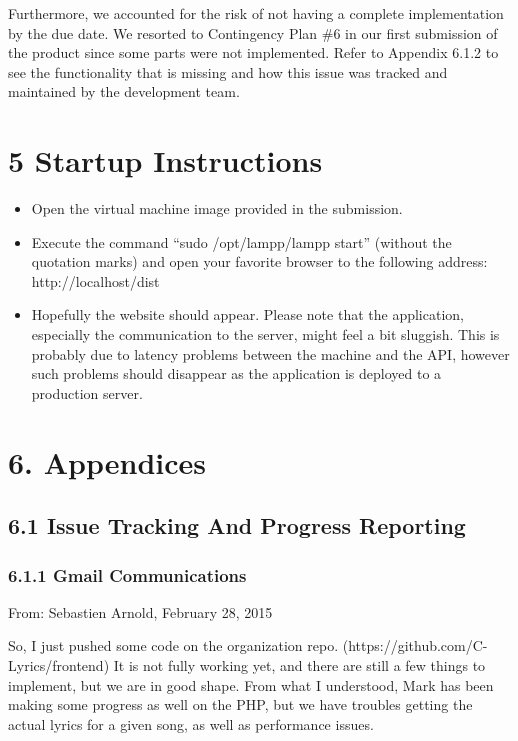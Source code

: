\documentclass[]{article}
\begin{document}
Furthermore, we accounted for the risk of not having a complete
implementation by the due date. We resorted to Contingency Plan \#6 in
our first submission of the product since some parts were not
implemented. Refer to Appendix 6.1.2 to see the functionality that is
missing and how this issue was tracked and maintained by the development
team.

\section{5 Startup Instructions}\label{startup-instructions}

\begin{itemize}
\itemsep1pt\parskip0pt
\item
  Open the virtual machine image provided in the submission.
\item
  Execute the command ``sudo /opt/lampp/lampp start'' (without the
  quotation marks) and open your favorite browser to the following
  address: http://localhost/dist
\item
  Hopefully the website should appear. Please note that the application,
  especially the communication to the server, might feel a bit sluggish.
  This is probably due to latency problems between the machine and the
  API, however such problems should disappear as the application is
  deployed to a production server.
\end{itemize}

\section{\textbf{6. Appendices}}\label{appendices}

\subsection{\textbf{6.1 Issue Tracking And Progress
Reporting}}\label{issue-tracking-and-progress-reporting}

\subsubsection{6.1.1 Gmail Communications}\label{gmail-communications}

From: Sebastien Arnold, February 28, 2015

So, I just pushed some code on the organization repo.
(https://github.com/C-Lyrics/frontend) It is not fully working yet, and
there are still a few things to implement, but we are in good shape.
From what I understood, Mark has been making some progress as well on
the PHP, but we have troubles getting the actual lyrics for a given
song, as well as performance issues.
\end{document}
